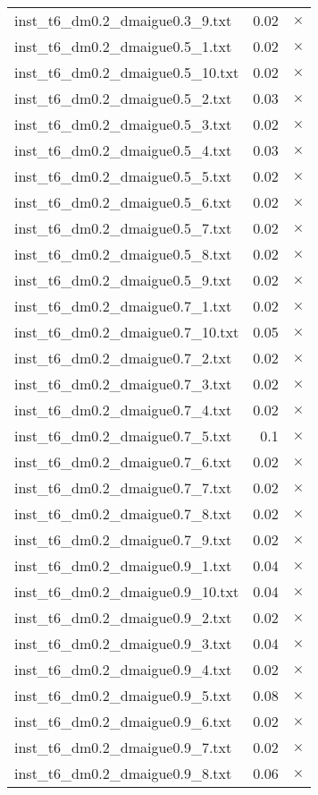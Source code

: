 \documentclass{article}
\begin{document}
\begin{center}
\begin{tabular}{lrr}
inst\_t6\_dm0.2\_dmaigue0.3\_9.txt & 0.02 & 
$\times$
\\
inst\_t6\_dm0.2\_dmaigue0.5\_1.txt & 0.02 & 
$\times$
\\
inst\_t6\_dm0.2\_dmaigue0.5\_10.txt & 0.02 & 
$\times$
\\
inst\_t6\_dm0.2\_dmaigue0.5\_2.txt & 0.03 & 
$\times$
\\
inst\_t6\_dm0.2\_dmaigue0.5\_3.txt & 0.02 & 
$\times$
\\
inst\_t6\_dm0.2\_dmaigue0.5\_4.txt & 0.03 & 
$\times$
\\
inst\_t6\_dm0.2\_dmaigue0.5\_5.txt & 0.02 & 
$\times$
\\
inst\_t6\_dm0.2\_dmaigue0.5\_6.txt & 0.02 & 
$\times$
\\
inst\_t6\_dm0.2\_dmaigue0.5\_7.txt & 0.02 & 
$\times$
\\
inst\_t6\_dm0.2\_dmaigue0.5\_8.txt & 0.02 & 
$\times$
\\
inst\_t6\_dm0.2\_dmaigue0.5\_9.txt & 0.02 & 
$\times$
\\
inst\_t6\_dm0.2\_dmaigue0.7\_1.txt & 0.02 & 
$\times$
\\
inst\_t6\_dm0.2\_dmaigue0.7\_10.txt & 0.05 & 
$\times$
\\
inst\_t6\_dm0.2\_dmaigue0.7\_2.txt & 0.02 & 
$\times$
\\
inst\_t6\_dm0.2\_dmaigue0.7\_3.txt & 0.02 & 
$\times$
\\
inst\_t6\_dm0.2\_dmaigue0.7\_4.txt & 0.02 & 
$\times$
\\
inst\_t6\_dm0.2\_dmaigue0.7\_5.txt & 0.1 & 
$\times$
\\
inst\_t6\_dm0.2\_dmaigue0.7\_6.txt & 0.02 & 
$\times$
\\
inst\_t6\_dm0.2\_dmaigue0.7\_7.txt & 0.02 & 
$\times$
\\
inst\_t6\_dm0.2\_dmaigue0.7\_8.txt & 0.02 & 
$\times$
\\
inst\_t6\_dm0.2\_dmaigue0.7\_9.txt & 0.02 & 
$\times$
\\
inst\_t6\_dm0.2\_dmaigue0.9\_1.txt & 0.04 & 
$\times$
\\
inst\_t6\_dm0.2\_dmaigue0.9\_10.txt & 0.04 & 
$\times$
\\
inst\_t6\_dm0.2\_dmaigue0.9\_2.txt & 0.02 & 
$\times$
\\
inst\_t6\_dm0.2\_dmaigue0.9\_3.txt & 0.04 & 
$\times$
\\
inst\_t6\_dm0.2\_dmaigue0.9\_4.txt & 0.02 & 
$\times$
\\
inst\_t6\_dm0.2\_dmaigue0.9\_5.txt & 0.08 & 
$\times$
\\
inst\_t6\_dm0.2\_dmaigue0.9\_6.txt & 0.02 & 
$\times$
\\
inst\_t6\_dm0.2\_dmaigue0.9\_7.txt & 0.02 & 
$\times$
\\
inst\_t6\_dm0.2\_dmaigue0.9\_8.txt & 0.06 & 
$\times$
\\
\hline\end{tabular}
\end{center}
\end{document}
